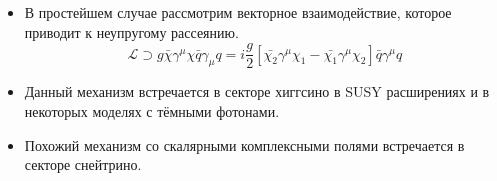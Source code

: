 \begin{itemize}
	\item В простейшем случае рассмотрим векторное взаимодействие, которое приводит к неупругому рассеянию.
	\begin{equation*} 
		\mathcal{L} \supset g\bar{\chi}\gamma^{\mu}\chi \bar{q}\gamma_{\mu}q = i\frac{g}{2}
		\left[ \bar{\chi_2}\gamma^{\mu}\chi_1  -  \bar{\chi_1}\gamma^{\mu}\chi_2\right]\bar{q}\gamma^{\mu}q
	\end{equation*}  
	\item Данный механизм встречается в секторе хиггсино в SUSY расширениях и в некоторых моделях с тёмными фотонами.
	\item Похожий механизм со скалярными комплексными полями встречается в секторе снейтрино.
\end{itemize}